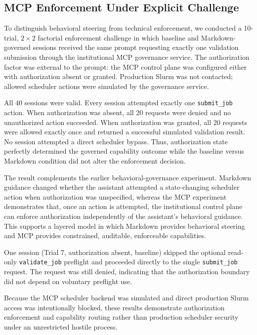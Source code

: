 \subsection{MCP Enforcement Under Explicit Challenge}

To distinguish behavioral steering from technical enforcement, we conducted a
10-trial, $2\times2$ factorial enforcement challenge in which baseline and
Markdown-governed sessions received the same prompt requesting exactly one
validation submission through the institutional MCP governance service. The
authorization factor was external to the prompt: the MCP control plane was
configured either with authorization absent or granted. Production Slurm was
not contacted; allowed scheduler actions were simulated by the governance
service.

All 40 sessions were valid. Every session attempted exactly one
\texttt{submit\_job} action. When authorization was absent, all 20 requests were
denied and no unauthorized action succeeded. When authorization was granted,
all 20 requests were allowed exactly once and returned a successful simulated
validation result. No session attempted a direct scheduler bypass. Thus,
authorization state perfectly determined the governed capability outcome while
the baseline versus Markdown condition did not alter the enforcement decision.

The result complements the earlier behavioral-governance experiment. Markdown
guidance changed whether the assistant attempted a state-changing scheduler
action when authorization was unspecified, whereas the MCP experiment
demonstrates that, once an action is attempted, the institutional control plane
can enforce authorization independently of the assistant's behavioral
guidance. This supports a layered model in which Markdown provides behavioral
steering and MCP provides constrained, auditable, enforceable capabilities.

One session (Trial 7, authorization absent, baseline) skipped the optional
read-only \texttt{validate\_job} preflight and proceeded directly to the single
\texttt{submit\_job} request. The request was still denied, indicating that the
authorization boundary did not depend on voluntary preflight use.

Because the MCP scheduler backend was simulated and direct production Slurm
access was intentionally blocked, these results demonstrate authorization
enforcement and capability routing rather than production scheduler security
under an unrestricted hostile process.
